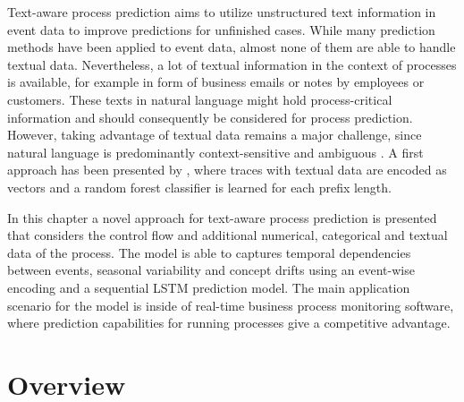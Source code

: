 Text-aware process prediction aims to utilize unstructured text information in event data to improve predictions for unfinished cases.
While many prediction methods have been applied to event data, almost none of them are able to handle textual data.
Nevertheless, a lot of textual information in the context of processes is available, for example in form of business emails or notes by employees or customers.
These texts in natural language might hold process-critical information and should consequently be considered for process prediction.
However, taking advantage of textual data remains a major challenge, since natural language is predominantly context-sensitive and ambiguous  \cite{textminingissues}.
A first approach has been presented by \citeauthor{DBLP:conf/bpm/TeinemaaDMF16}  \cite{DBLP:conf/bpm/TeinemaaDMF16}, where traces with textual data are encoded as vectors and a random forest classifier is learned for each prefix length.

In this chapter a novel approach for text-aware process prediction is presented that considers the control flow and additional numerical, categorical and textual data of the process.
The model is able to captures temporal dependencies between events, seasonal variability and concept drifts using an event-wise encoding and a sequential LSTM prediction model.
The main application scenario for the model is inside of real-time business process monitoring software, where prediction capabilities for running processes give a competitive advantage.

\section{Overview}

